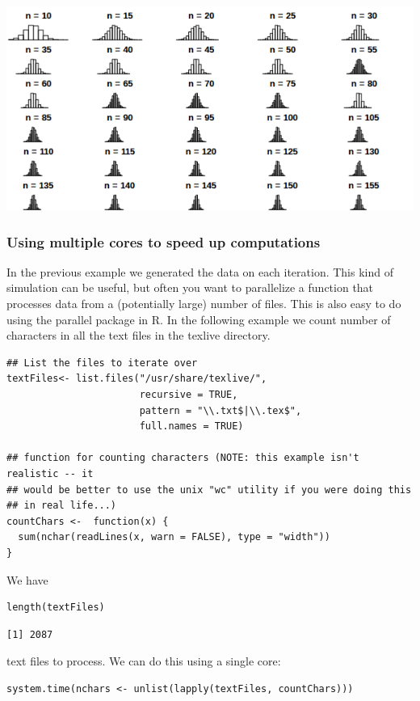 \documentclass[11pt]{article}
\begin{document}
\includegraphics[width=.9\linewidth]{images/samplingDist.png}


\subsubsection{Using multiple cores to speed up computations}
\label{sec-6-3-2}
In the previous example we generated the data on each iteration. This kind of simulation can be useful, but often you want to parallelize a function that processes data from a (potentially large) number of files. This is also easy to do using the parallel package in R. In the following example we count number of characters in all the text files in the texlive directory.
\begin{verbatim}
## List the files to iterate over
textFiles<- list.files("/usr/share/texlive/", 
                       recursive = TRUE, 
                       pattern = "\\.txt$|\\.tex$",
                       full.names = TRUE)

## function for counting characters (NOTE: this example isn't realistic -- it 
## would be better to use the unix "wc" utility if you were doing this
## in real life...)
countChars <-  function(x) {
  sum(nchar(readLines(x, warn = FALSE), type = "width"))
}
\end{verbatim}

We have
\begin{verbatim}
length(textFiles)
\end{verbatim}

\begin{verbatim}
[1] 2087
\end{verbatim}
text files to process. We can do this using a single core:
\begin{verbatim}
system.time(nchars <- unlist(lapply(textFiles, countChars)))
\end{verbatim}
\end{document}
